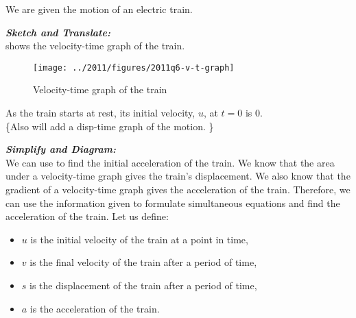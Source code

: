 %
%
%


\begin{subquestions}
	
\subquestion
We are given the motion of an electric train.

\begin{subsubquestions}
	
\subsubquestion

\textbf{\textit{Sketch and Translate:}} \\
 shows the velocity-time graph of the train.
\begin{figure}[H]
	\begin{center}
		\texttt{[image: ../2011/figures/2011q6-v-t-graph]}
		\caption{\label{2011:q6:VTGraph} Velocity-time graph of the train}
	\end{center}
\end{figure}
As the train starts at rest, its initial velocity, $u$, at $t=0$ is 0. \\
\{Also will add a disp-time graph of the motion. \}


\subsubquestion

\textbf{\textit{Simplify and Diagram:}} \\ 
We can use  to find the initial acceleration of the train. We know that the area under a velocity-time graph gives the train's displacement. We also know that the gradient of a velocity-time graph gives the acceleration of the train. Therefore, we can use the information given to formulate simultaneous equations and find the acceleration of  the train.
Let us define:
\begin{itemize}
	\item $u$ is the initial velocity of the train at a point in time,
	\item $v$ is the final velocity of the train after a period of time,
	\item $s$ is the displacement of the train after a period of time,
	\item $a$ is the acceleration of the train. 
\end{itemize}




\end{subsubquestions}
\end{subquestions}
